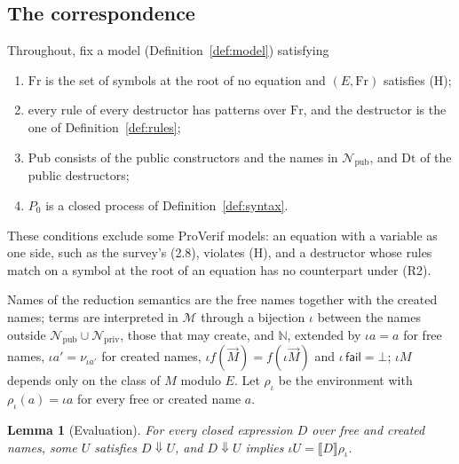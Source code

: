 \documentclass[11pt]{article}
\theoremstyle{definition}
\theoremstyle{plain}
\newtheorem{lemma}[definition]{Lemma}
\theoremstyle{remark}
\newcommand{\N}{\mathbb{N}}
\newcommand{\Msg}{\mathcal{M}}
\newcommand{\Fr}{\mathrm{Fr}}
\newcommand{\Pub}{\mathrm{Pub}}
\newcommand{\Dt}{\mathrm{Dt}}
\newcommand{\sem}[1]{\llbracket #1 \rrbracket}
\newcommand{\pv}[1]{\mathsf{#1}}
\newcommand{\fail}{\pv{fail}}
\newcommand{\ev}{\Downarrow}
\newcommand{\Npub}{\mathcal{N}_{\mathrm{pub}}}
\newcommand{\Npriv}{\mathcal{N}_{\mathrm{priv}}}
\newcommand{\red}[1]{\text{(Red #1)}}
\begin{document}
\subsection{The correspondence}

Throughout, fix a model (Definition~\ref{def:model}) satisfying
\begin{enumerate}
\item[(R1)] $\Fr$ is the set of symbols at the root of no equation and $(E,\Fr)$ satisfies (H);
\item[(R2)] every rule of every destructor has patterns over $\Fr$, and the destructor is the one of Definition~\ref{def:rules};
\item[(R3)] $\Pub$ consists of the public constructors and the names in $\Npub$, and $\Dt$ of the public destructors;
\item[(R4)] $P_0$ is a closed process of Definition~\ref{def:syntax}.
\end{enumerate}
These conditions exclude some ProVerif models: an equation with a variable as one side, such as the survey's (2.8), violates (H), and a destructor whose rules match on a symbol at the root of an equation has no counterpart under (R2).

Names of the reduction semantics are the free names together with the created names; terms are interpreted in $\Msg$ through a bijection $\iota$ between the names outside $\Npub\cup\Npriv$, those that \red{Res} may create, and $\N$, extended by $\iota a=a$ for free names, $\iota a'=\nu_{\iota a'}$ for created names, $\iota f(\vec M)=f(\iota\vec M)$ and $\iota\,\fail=\bot$; $\iota M$ depends only on the class of $M$ modulo $E$. Let $\rho_\iota$ be the environment with $\rho_\iota(a)=\iota a$ for every free or created name $a$.

\begin{lemma}[Evaluation]\label{lem:eval}
For every closed expression $D$ over free and created names, some $U$ satisfies $D\ev U$, and $D\ev U$ implies $\iota U=\sem{D}\rho_\iota$.
\end{lemma}
\end{document}
